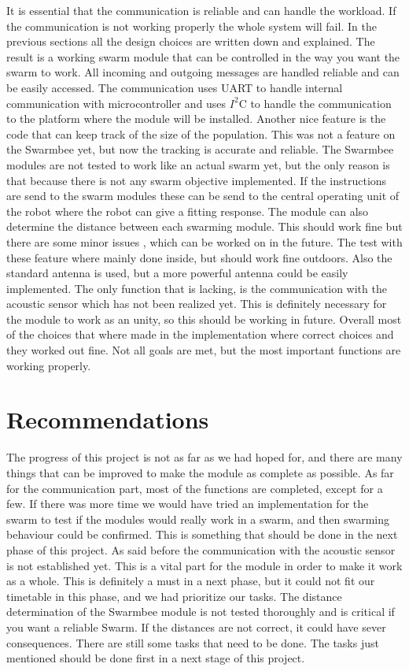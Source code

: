 \documentclass[10pt,a4paper]{article}
\begin{document}
It is essential that the communication is reliable and can handle the workload. If the communication is not working properly the whole system will fail. In the previous sections all the design choices are written down and explained. The result is a working swarm module that can be controlled in the way you want the swarm to work. All incoming and outgoing messages are handled reliable and can be easily accessed. The communication uses UART to handle internal communication with microcontroller and uses $I^2$C to handle the communication to the platform where the module will be installed. Another nice feature is the code that can keep track of the size of the population. This was not a feature on the Swarmbee yet, but now the tracking is accurate and reliable. The Swarmbee modules are not tested to work like an actual swarm yet, but the only reason is that because there is not any swarm objective implemented. If the instructions are send to the swarm modules these can be send to the central operating unit of the robot where the robot can give a fitting response. The module can also determine the distance between each swarming module. This should work fine but there are some minor issues , which can be worked on in the future. The test with these feature where mainly done inside, but should work fine outdoors. Also the standard antenna is used, but a more powerful antenna could be easily implemented. The only function that is lacking, is the communication with the acoustic sensor which has not been realized yet. This is definitely necessary for the module to work as an unity, so this should be working in future. Overall most of the choices that where made in the implementation where correct choices and they worked out fine. Not all goals are met, but the most important functions are working properly. 


\section{Recommendations}
The progress of this project is not as far as we had hoped for, and there are many things that can be improved to make the module as complete as possible. As far for the communication part, most of the functions are completed, except for a few. If there was more time we would have tried an implementation for the swarm to test if the modules would really work in a swarm, and then swarming behaviour could be confirmed. This is something that should be done in the next phase of this project. As said before the communication with the acoustic sensor is not established yet. This is a vital part for the module in order to make it work as a whole. This is definitely a must in a next phase, but it could not fit our timetable in this phase, and we had prioritize our tasks. The distance determination of the Swarmbee module is not tested thoroughly and is critical if you want a reliable Swarm. If the distances are not correct, it could have sever consequences. There are still some tasks that need to be done. The tasks just mentioned should be done first in a next stage of this project.
\end{document}
